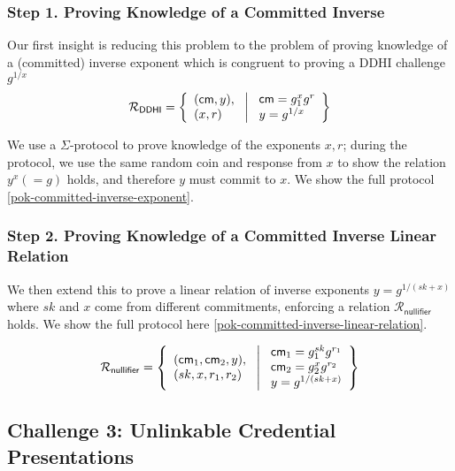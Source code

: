 \subsubsection*{Step 1. Proving Knowledge of a Committed Inverse}
Our first insight is reducing this problem to the problem of proving knowledge of a (committed) inverse exponent which is congruent to proving a DDHI challenge $g^{1/x}$
\[
\mathcal{R}_{\mathsf{DDHI}} = \left\{ 
\begin{array}{l} (\mathsf{cm}, y),\\
(x, r) 
\end{array}
\ \middle|
\ \begin{array}{l}
\mathsf{cm} = g_1^{x} g^r \\
y = g^{1/x} \\
\end{array} \right\}
\]

We use a $\Sigma$-protocol to prove knowledge of the exponents $x, r$; during the protocol, we use the same random coin and response from $x$ to show the relation $y^x (=g)$ holds, and therefore $y$ must commit to $x$. We show the full protocol \ref{pok-committed-inverse-exponent}. 

\subsubsection*{Step 2. Proving Knowledge of a Committed Inverse Linear Relation}

We then extend this to prove a linear relation of inverse exponents $y = g^{1/(sk+x)}$ where $sk$ and $x$ come from different commitments, enforcing a relation $\mathcal{R}_{\mathsf{nullifier}}$ holds. We show the full protocol here \ref{pok-committed-inverse-linear-relation}. 

\[
\mathcal{R}_{\mathsf{nullifier}} = \left\{ 
\begin{array}{l} (\mathsf{cm}_1, \mathsf{cm}_2, y),\\
(sk, x, r_1, r_2) 
\end{array}
\ \middle|
\ \begin{array}{l}
\mathsf{cm}_1 = g_1^{sk} g^{r_1} \\
\mathsf{cm}_2 = g_2^{x} g^{r_2} \\
y = g^{1/(sk + x)} \\
\end{array} \right\}
\]


\subsection{Challenge 3: Unlinkable Credential Presentations}

